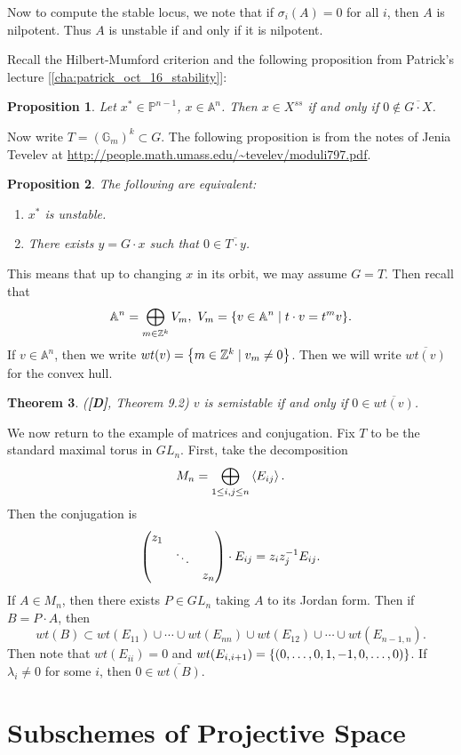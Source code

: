 \documentclass[leqno, openany]{memoir}
\newtheorem{thm}{Theorem}[section]
\newtheorem{prop}[thm]{Proposition}
\theoremstyle{definition}
\theoremstyle{remark}
\theoremstyle{plain}
\theoremstyle{definition}
\theoremstyle{remark}
\newcommand{\A}{\mathbb{A}}
\newcommand{\Z}{\mathbb{Z}}
\renewcommand{\P}{\mathbb{P}}
\newcommand{\ol}[1]{\overline{#1}}
\begin{document}
Now to compute the stable locus, we note that if $\sigma_i(A) = 0$ for all $i$,
then $A$ is nilpotent. Thus $A$ is unstable if and only if it is nilpotent.

Recall the Hilbert-Mumford criterion and the following proposition from
Patrick's lecture [\autoref{cha:patrick_oct_16_stability}]:

\begin{prop} Let $x^* \in \P^{n-1}$, $x \in \A^n$. Then $x \in X^{ss}$ if and
only if $0 \notin \ol{G \cdot X}$.  \end{prop}

Now write $T = (\mathbb{G}_m)^k \subset G$. The following proposition is from
the notes of Jenia Tevelev at
\url{http://people.math.umass.edu/~tevelev/moduli797.pdf}.

\begin{prop} The following are equivalent: \begin{enumerate} \item $x^*$ is
unstable.  \item There exists $y = G \cdot x$ such that $0 \in \ol{T \cdot y}$.
\end{enumerate} \end{prop}

This means that up to changing $x$ in its orbit, we may assume $G = T$. Then
recall that \[ \A^n = \bigoplus_{m \in \Z^k} V_m,\ V_m = \qty{v \in \A^n \mid t
\cdot v = t^m v}. \] If $v \in \A^n$, then we write $wt(v) = \qty{m \in \Z^k
\mid v_m \neq 0}$. Then we will write $\ol{wt(v)}$ for the convex hull.

\begin{thm}(\textbf{[D]}, Theorem 9.2) $v$ is semistable if and only if $0 \in
\ol{wt(v)}$.  \end{thm}

We now return to the example of matrices and conjugation. Fix $T$ to be the
standard maximal torus in $GL_n$. First, take the decomposition \[ M_n =
    \bigoplus_{1 \leq i,j \leq n} \ev{E_{ij}}. \] Then the conjugation is \[
\mqty(\dmat{z_1, \ddots, z_n}) \cdot E_{ij} = z_i z_j^{-1} E_{ij}. \] If $A \in
M_{n}$, then there exists $P \in GL_n$ taking $A$ to its Jordan form. Then if
$B = P \cdot A$, then \[ wt(B) \subset wt(E_{11}) \cup \cdots \cup wt(E_{nn})
\cup wt(E_{12}) \cup \cdots \cup wt(E_{n-1,n}). \] Then note that $wt(E_{ii}) =
\qty{0}$ and $wt(E_{i,i+1}) = \qty{(0, \ldots, 0, 1, -1, 0, \ldots, 0)}$. If
$\lambda_i \neq 0$ for some $i$, then $0 \in \ol{wt(B)}$. 

\section{Subschemes of Projective Space}%
\end{document}
